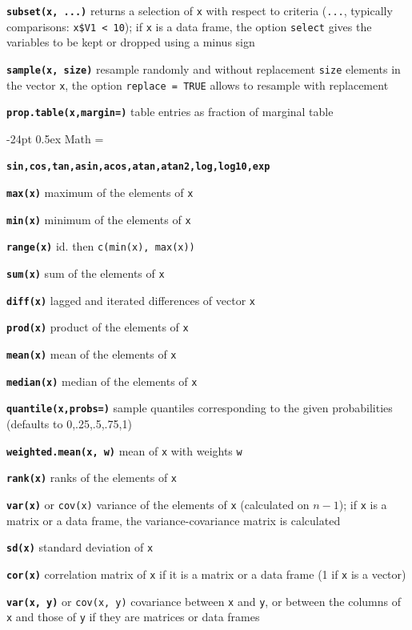 \documentclass[10pt,landscape]{article}
\makeatletter
\renewcommand\section{\@startsection{section}{1}{0mm}%
                                     {-24pt}%
                                     {0.5ex}%
                                {\color{blue}\normalfont\large\bfseries}}
\newcommand{\code}{\texttt}
\newcommand{\bcode}[1]{\texttt{\textbf{#1}}}
\makeatother
\begin{document}
\begin{multicols}{3}
\bcode{subset(x, ...)}  returns a selection of \code{x} with respect to criteria (\code{...}, typically comparisons: \code{x\$V1 < 10}); if \code{x} is a data frame, the option \code{select} gives the variables to be kept or dropped using a minus sign

\bcode{sample(x, size)}  resample randomly and without replacement \code{size} elements in the vector \code{x}, the option \code{replace = TRUE} allows to resample with replacement

\bcode{prop.table(x,margin=)} table entries as fraction of marginal table 




\section{Math}
\everypar={\hangindent=9mm}

\bcode{sin,cos,tan,asin,acos,atan,atan2,log,log10,exp}

\bcode{max(x)}  maximum of the elements of \code{x}

\bcode{min(x)}  minimum of the elements of \code{x}

\bcode{range(x)}  id. then \code{c(min(x), max(x))}

\bcode{sum(x)}  sum of the elements of \code{x}

\bcode{diff(x)}  lagged and iterated differences of vector \code{x}

\bcode{prod(x)}  product of the elements of \code{x}

\bcode{mean(x)}  mean of the elements of \code{x}

\bcode{median(x)}  median of the elements of \code{x}

\bcode{quantile(x,probs=)} sample quantiles
     corresponding to the given probabilities (defaults to 0,.25,.5,.75,1)

\bcode{weighted.mean(x, w)} mean of \code{x} with weights \code{w}

\bcode{rank(x)}  ranks of the elements of \code{x}

\bcode{var(x)} or \code{cov(x)}  variance of the elements of \code{x}
(calculated on $n-1$); if \code{x} is a matrix or a data frame, the
variance-covariance matrix is calculated

\bcode{sd(x)} standard deviation of \code{x}

\bcode{cor(x)}  correlation matrix of \code{x} if it is a matrix or a
data frame (1 if \code{x} is a vector)

\bcode{var(x, y)} or \code{cov(x, y)}  covariance between \code{x} and \code{y}, or between the columns of \code{x} and those of \code{y} if they are matrices or data frames


\end{multicols}
\end{document}
